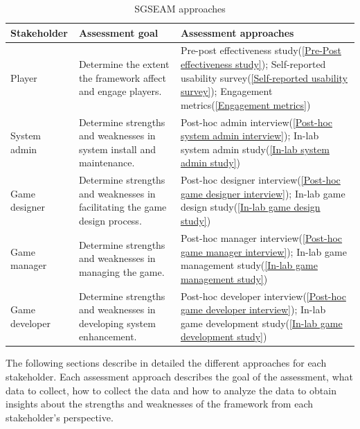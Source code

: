 \documentclass[11pt,oneside]{book}
\newcommand\tabhead[1]{\small\textbf{#1}}
\begin{document}
\begin{table}[ht!]
  \centering
  \begin{tabular}{|p{}|p{}|p{}|}
    \hline
    \tabhead{Stakeholder}&
    \tabhead{Assessment goal}&
    \tabhead{Assessment approaches} \\
    \hline
    Player&
    Determine the extent the framework affect and engage players.&
    	Pre-post effectiveness study(\ref{Pre-Post effectiveness study});\newline
	Self-reported usability survey(\ref{Self-reported usability survey});\newline
	Engagement metrics(\ref{Engagement metrics}) \\
    \hline
    System admin&
    Determine strengths and weaknesses in system install and maintenance.&
    	Post-hoc admin interview(\ref{Post-hoc system admin interview});\newline
	In-lab system admin study(\ref{In-lab system admin study}) \\
    \hline
    Game designer&
    Determine strengths and weaknesses in facilitating the game design process.&
    	Post-hoc designer interview(\ref{Post-hoc game designer interview});\newline
	In-lab game design study(\ref{In-lab game design study})\\
    \hline
    Game manager&
    Determine strengths and weaknesses in managing the game.&
    	Post-hoc manager interview(\ref{Post-hoc game manager interview});\newline
	In-lab game management study(\ref{In-lab game management study})\\
    \hline
    Game developer&
    Determine strengths and weaknesses in developing system enhancement.&
    	Post-hoc developer interview(\ref{Post-hoc game developer interview});\newline
	In-lab game development study(\ref{In-lab game development study}) \\
    \hline
  \end{tabular}
  \caption{SGSEAM approaches}
  \label{table:approaches}
\end{table}

The following sections describe in detailed the different approaches for each stakeholder.  Each assessment 
approach describes the goal of the assessment, what data to collect, how to collect the data and how to 
analyze the data to obtain insights about the strengths and weaknesses of the framework from each 
stakeholder's perspective.
\end{document}
